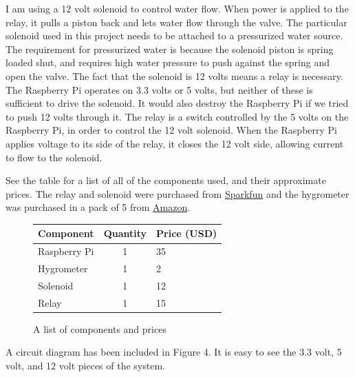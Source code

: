 \documentclass[11pt] {article}
\begin{document}
I am using a 12 volt solenoid to control water flow. When power is applied to the relay, it pulls a piston back and
lets water flow through the valve. The particular solenoid used in this project needs to be attached to a pressurized
water source. The requirement for pressurized water is because the solenoid piston is spring loaded shut, and requires
high water pressure to push against the spring and open the valve.
\newpage
The fact that the solenoid is 12 volts means a relay is necessary. The Raspberry Pi operates on 3.3 volts or 5 volts,
but neither of these is sufficient to drive the solenoid. It would also destroy the Raspberry Pi if we tried to push
12 volts through it. The relay is a switch controlled by the 5 volts on the Raspberry Pi, in order to control the 12
volt solenoid. When the Raspberry Pi applies voltage to its side of the relay, it closes the 12 volt side, allowing
current to flow to the solenoid.

See the table for a list of all of the components used, and their approximate prices. The relay and solenoid were
purchased from \href{www.sparkfun.com}{Sparkfun} and the hygrometer was purchased in a pack of 5 from
\href{www.amazon.com}{Amazon}.

\begin{figure}[H]
    \begin{center}
        \begin{tabular}{ | l | c | l | }
            \hline
            Component & Quantity & Price (USD) \\
            \hline \hline
            Raspberry Pi & 1 & 35 \\ \hline
            Hygrometer & 1 & 2 \\ \hline
            Solenoid & 1 & 12 \\ \hline
            Relay & 1 & 15 \\ \hline
        \end{tabular}
        \caption{A list of components and prices}
    \end{center}
\end{figure}

A circuit diagram has been included in Figure 4. It is easy to see the 3.3 volt, 5 volt, and 12 volt pieces of the system.
\end{document}
